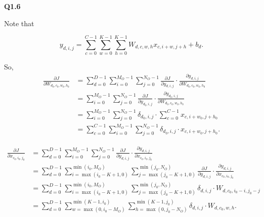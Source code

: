 \documentclass[
  course = {{16-720B Computer Vision}},
  quartile = {{1}},
  assignment = 3-Neural\ Networks\ for\ Recognition,
  name = {{Kangle Deng}},
  email = {{kangled@andrew.cmu.edu}},
  firstexercise = 1
]{aga-homework}
\begin{document}
\noindent \textbf{Q1.6}

Note that

\begin{equation*}
    y_{d,i,j} = \sum \limits_{c=0}^{C-1} \sum \limits_{w=0}^{K-1} \sum \limits_{h=0}^{K-1} W_{d,c,w,h} x_{c,i+w,j+h} + b_d.
\end{equation*}

So,
\begin{equation*}
\begin{aligned}
        \frac{\partial J}{\partial W_{d_0,c_0,w_0,h_0}} & = \sum \limits_{d=0}^{D-1} \sum \limits_{i=0}^{M_O-1} \sum \limits_{j=0}^{N_O-1} \frac{\partial J}{\partial y_{d,i,j}} \cdot \frac{\partial y_{d,i,j}}{\partial W_{d_0,c_0,w_0,h_0}} \\
        & = \sum \limits_{i=0}^{M_O-1} \sum \limits_{j=0}^{N_O-1} \frac{\partial J}{\partial y_{d_0,i,j}} \cdot \frac{\partial y_{d_0,i,j}}{\partial W_{d_0,c_0,w_0,h_0}} \\
        & = \sum \limits_{i=0}^{M_O-1} \sum \limits_{j=0}^{N_O-1} \delta_{d_0,i,j} \cdot \sum \limits_{c=0}^{C-1} x_{c,i+w_0,j+h_0} \\
        & =\sum \limits_{c=0}^{C-1} \sum \limits_{i=0}^{M_O-1} \sum \limits_{j=0}^{N_O-1} \delta_{d_0,i,j} \cdot  x_{c,i+w_0,j+h_0}.
\end{aligned}
\end{equation*}

\begin{equation*}
    \begin{aligned}
         \frac{\partial J}{\partial x_{c_0,i_0,j_0}} & =   \sum \limits_{d=0}^{D-1} \sum \limits_{i=0}^{M_O-1} \sum \limits_{j=0}^{N_O-1} \frac{\partial J}{\partial y_{d,i,j}} \cdot \frac{\partial y_{d,i,j}}{\partial x_{c_0,i_0,j_0}} \\
         & =   \sum \limits_{d=0}^{D-1} \sum \limits_{i=\max(i_0-K+1,0)}^{\min(i_0,M_O)} \sum \limits_{j=\max(j_0-K+ 1,0)}^{\min(j_0,N_O)} \frac{\partial J}{\partial y_{d,i,j}} \cdot \frac{\partial y_{d,i,j}}{\partial x_{c_0,i_0,j_0}} \\
         & = \sum \limits_{d=0}^{D-1} \sum \limits_{i=\max(i_0-K+1,0)}^{\min(i_0,M_O)} \sum \limits_{j=\max(j_0-K+ 1,0)}^{\min(j_0,N_O)} \delta_{d,i,j} \cdot W_{d,c_0,i_0-i,j_0-j} \\
         & = \sum \limits_{d=0}^{D-1} \sum \limits_{w=\max(0,i_0-M_O)}^{\min(K-1,i_0)} \sum \limits_{h=\max(0,j_0-N_O)}^{\min(K-1,j_0)} \delta_{d,i,j} \cdot W_{d,c_0,w,h}.
    \end{aligned}
\end{equation*}
\end{document}
